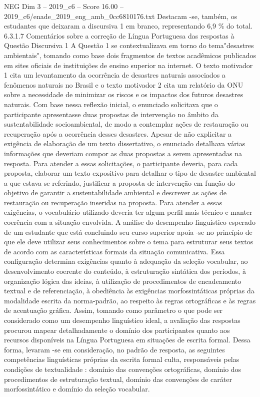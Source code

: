 \begin{textsample}{NEG Dim 3 – 2019\_c6 – Score 16.00 – 2019\_c6/enade\_2019\_eng\_amb\_0cc6810176.txt}
Destacam -se, também, os estudantes que deixaram a discursiva 1 em branco, representando 6,9 \% do total. 6.3.1.7 Comentários sobre a correção de Língua Portuguesa das respostas à Questão Discursiva 1 A Questão 1 se contextualizava em torno do tema"desastres ambientais", tomando como base dois fragmentos de textos acadêmicos publicados em sites oficiais de instituições de ensino superior na internet.
O texto motivador 1 cita um levantamento da ocorrência de desastres naturais associados a fenômenos naturais no Brasil e o texto motivador 2 cita um relatório da ONU sobre a necessidade de minimizar os riscos e os impactos dos futuros desastres naturais.
Com base nessa reflexão inicial, o enunciado solicitava que o participante apresentasse duas propostas de intervenção no âmbito da sustentabilidade socioambiental, de modo a contemplar ações de restauração ou recuperação após a ocorrência desses desastres.
Apesar de não explicitar a exigência de elaboração de um texto dissertativo, o enunciado detalhava várias informações que deveriam compor as duas propostas a serem apresentadas na resposta.
Para atender a essas solicitações, o participante deveria, para cada proposta, elaborar um texto expositivo para detalhar o tipo de desastre ambiental a que estava se referindo, justificar a proposta de intervenção em função do objetivo de garantir a sustentabilidade ambiental e descrever as ações de restauração ou recuperação inseridas na proposta.
Para atender a essas exigências, o vocabulário utilizado deveria ter algum perfil mais técnico e manter coerência com a situação envolvida.
A análise do desempenho linguístico esperado de um estudante que está concluindo seu curso superior apoia -se no princípio de que ele deve utilizar seus conhecimentos sobre o tema para estruturar seus textos de acordo com as características formais da situação comunicativa.
Essa configuração determina exigências quanto à adequação da seleção vocabular, ao desenvolvimento coerente do conteúdo, à estruturação sintática dos períodos, à organização lógica das ideias, à utilização de procedimentos de encadeamento textual e de referenciação, à obediência às exigências morfossintáticas próprias da modalidade escrita da norma-padrão, ao respeito às regras ortográficas e às regras de acentuação gráfica.
Assim, tomando como parâmetro o que pode ser considerado como um desempenho linguístico ideal, a avaliação das respostas procurou mapear detalhadamente o domínio dos participantes quanto aos recursos disponíveis na Língua Portuguesa em situações de escrita formal.
Dessa forma, levaram -se em consideração, no padrão de resposta, as seguintes competências linguísticas próprias da escrita formal culta, responsáveis pelas condições de textualidade : domínio das convenções ortográficas, domínio dos procedimentos de estruturação textual, domínio das convenções de caráter morfossintático e domínio da seleção vocabular.

\end{textsample}
